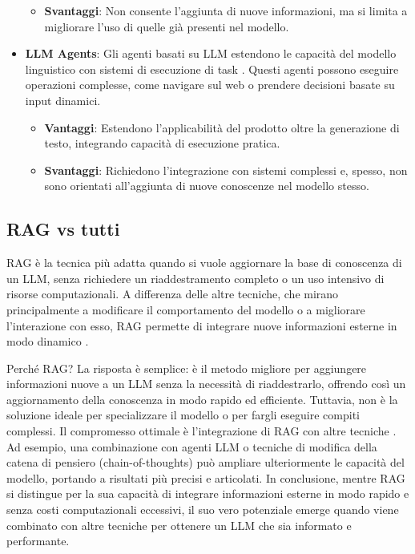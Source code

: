 \begin{itemize}
\begin{itemize}
            \item \textbf{Svantaggi}: Non consente l'aggiunta di nuove informazioni, ma si limita a migliorare l'uso di quelle già presenti nel modello.
        \end{itemize}
    \item \textbf{LLM Agents}: Gli agenti basati su LLM estendono le capacità del modello linguistico con sistemi di esecuzione di task \cite{llmagents}. Questi agenti possono eseguire operazioni complesse, come navigare sul web o prendere decisioni basate su input dinamici.
        \begin{itemize}
            \item \textbf{Vantaggi}: Estendono l'applicabilità del prodotto oltre la generazione di testo, integrando capacità di esecuzione pratica.
            \item \textbf{Svantaggi}: Richiedono l'integrazione con sistemi complessi e, spesso, non sono orientati all'aggiunta di nuove conoscenze nel modello stesso.
        \end{itemize}
\end{itemize}

\subsection{RAG vs tutti}
RAG è la tecnica più adatta quando si vuole aggiornare la base di conoscenza di un LLM, senza richiedere un riaddestramento completo o un uso intensivo di risorse computazionali. A differenza delle altre tecniche, che mirano principalmente a modificare il comportamento del modello o a migliorare l'interazione con esso, RAG permette di integrare nuove informazioni esterne in modo dinamico \cite{ragandfine}.

Perché RAG? La risposta è semplice: è il metodo migliore per aggiungere informazioni nuove a un LLM senza la necessità di riaddestrarlo, offrendo così un aggiornamento della conoscenza in modo rapido ed efficiente. Tuttavia, non è la soluzione ideale per specializzare il modello o per fargli eseguire compiti complessi.
Il compromesso ottimale è l'integrazione di RAG con altre tecniche \cite{lewis2021retrievalaugmentedgenerationknowledgeintensivenlp,zhao2024retrievalaugmentedgenerationrag}. Ad esempio, una combinazione con agenti LLM o tecniche di modifica della catena di pensiero (chain-of-thoughts) può ampliare ulteriormente le capacità del modello, portando a risultati più precisi e articolati.
In conclusione, mentre RAG si distingue per la sua capacità di integrare informazioni esterne in modo rapido e senza costi computazionali eccessivi, il suo vero potenziale emerge quando viene combinato con altre tecniche per ottenere un LLM che sia informato e performante.